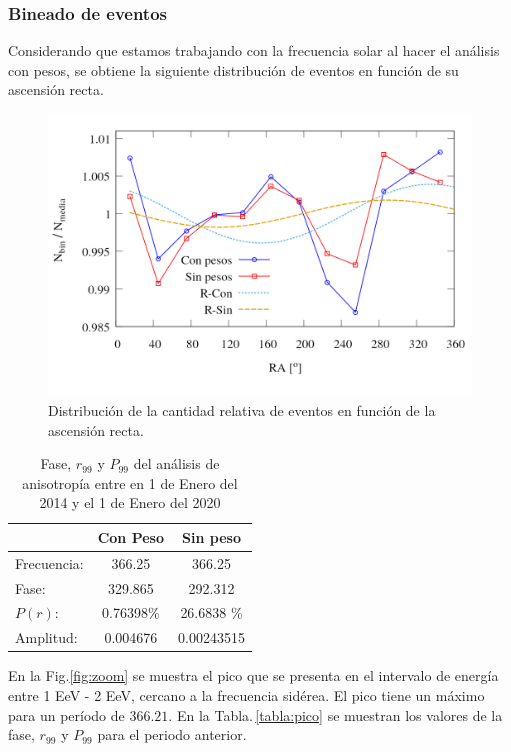 	\subsubsection{Bineado de eventos }


	Considerando que estamos trabajando con la frecuencia solar al hacer el análisis con pesos, se obtiene la siguiente distribución de eventos en función de su ascensión recta.
	\begin{figure}[H]
		\centering
		\includegraphics[width=0.75\linewidth]{eventos_clasificados_por_RA_v4.png}
		\caption{Distribución de la cantidad relativa de eventos en función de la ascensión recta.}
	\end{figure}




\begin{table}[H]
\centering
\begin{tabular}{l|c|c}
				& Con Peso 	& Sin peso 		\\ \hline
Frecuencia:		& 366.25 	& 366.25 		\\
Fase:			& 329.865 	& 292.312		\\
$P(r)$:			& 0.76398\%	& 26.6838 \% 	\\
Amplitud:		& 0.004676 	& 0.00243515	\\
\end{tabular}
\caption{Fase, $r_{99}$ y $P_{99}$ del análisis de anisotropía entre en 1 de Enero del 2014 y el 1 de Enero del 2020}
\end{table}



En la Fig.\ref{fig:zoom} se muestra el pico que se presenta en  el intervalo de energía entre 1 EeV - 2 EeV, cercano a la frecuencia sidérea. El pico tiene un máximo para un período de $366.21$. En la Tabla.\,\ref{tabla:pico} se muestran los valores de la fase, $r_{99}$ y $P_{99}$ para el periodo anterior.

